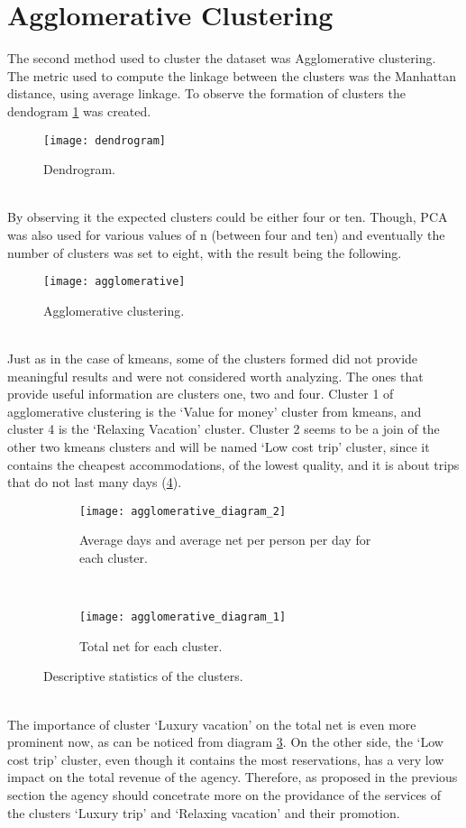 \section{Agglomerative Clustering}
The second method used to cluster the dataset was Agglomerative clustering. The metric used to compute the linkage between the clusters was the Manhattan distance, using average linkage. To observe the formation of clusters the dendogram \ref{fig:dendrogram} was created. \\
\begin{figure}[ht]
\centering
\texttt{[image: dendrogram]}
\caption{Dendrogram.}
\label{fig:dendrogram}
\end{figure}
\\
 By observing it the expected clusters could be either four or ten. Though, PCA was also used for various values of n (between four and ten) and eventually the number of clusters was set to eight, with the result being the following. \\
\begin{figure}[ht]
\centering
\texttt{[image: agglomerative]}
\caption{Agglomerative clustering.}
\label{fig:agglomerative}
\end{figure}
\\
Just as in the case of kmeans, some of the clusters formed did not provide meaningful results and were not considered worth analyzing. The ones that provide useful information are clusters one, two and four. Cluster 1 of agglomerative clustering is the `Value for money' cluster from kmeans, and cluster 4 is the `Relaxing Vacation' cluster. Cluster 2 seems to be a join of the other two kmeans clusters and will be named `Low cost trip' cluster, since it contains the cheapest accommodations, of the lowest quality, and it is about trips that do not last many days (\ref{fig:agglomerative2}). 
\begin{figure}[ht]
\centering
\begin{subfigure}{0.8\textwidth}
\centering
\texttt{[image: agglomerative\_diagram\_2]}
\caption{Average days and average net per person per day for each cluster.}
\label{fig:agglomerative1}
\end{subfigure}%
\\
\begin{subfigure}{0.8\textwidth}
\centering
\texttt{[image: agglomerative\_diagram\_1]}
\caption{Total net for each cluster.}
\label{fig:agglomerative2}
\end{subfigure}%
\caption{Descriptive statistics of the clusters.}
\label{fig:agglomerative_descriptives}
\end{figure}
\\
The importance of cluster `Luxury vacation' on the total net is even more prominent now, as can be noticed from diagram \ref{fig:agglomerative1}. On the other side, the `Low cost trip' cluster, even though it contains the most reservations, has a very low impact on the total revenue of the agency. Therefore, as proposed in the previous section the agency should concetrate more on the providance of the services of the clusters `Luxury trip' and `Relaxing vacation' and their promotion.